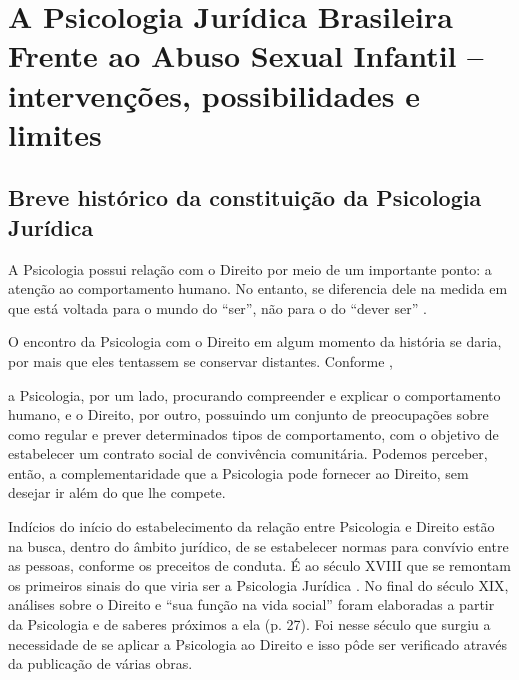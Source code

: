 
\chapter{A Psicologia Jurídica Brasileira Frente ao Abuso Sexual Infantil -- intervenções, possibilidades e limites}

\section{Breve histórico da constituição da Psicologia Jurídica}

A Psicologia possui relação com o Direito por meio de um importante ponto: a atenção ao comportamento humano. No entanto, se diferencia dele na medida em que está voltada para o mundo do ``ser'', não para o do ``dever ser'' .

O encontro da Psicologia com o Direito em algum momento da história se daria, por mais que eles tentassem se conservar distantes. Conforme ,

\begin{citacao}
	a Psicologia, por um lado, procurando compreender e explicar o comportamento humano, e o Direito, por outro, possuindo um conjunto de preocupações sobre como regular e prever determinados tipos de comportamento, com o objetivo de estabelecer um contrato social de convivência comunitária. Podemos perceber, então, a complementaridade que a Psicologia pode fornecer ao Direito, sem desejar ir além do que lhe compete.
\end{citacao}

Indícios do início do estabelecimento da relação entre Psicologia e Direito estão na busca, dentro do âmbito jurídico, de se estabelecer normas para convívio entre as pessoas, conforme os preceitos de conduta. É ao século XVIII que se remontam os primeiros sinais do que viria ser a Psicologia Jurídica \cite{JESUS2001}. No final do século XIX, análises sobre o Direito e ``sua função na vida social'' foram elaboradas a partir da Psicologia e de saberes próximos a ela (p. 27). Foi nesse século que surgiu a necessidade de se aplicar a Psicologia ao Direito e isso pôde ser verificado através da publicação de várias obras.\footnotemark


